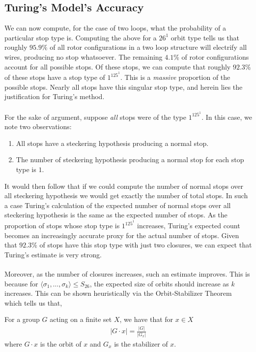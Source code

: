 \subsection{Turing's Model's Accuracy}\label{justify_turing}
We can now compute, for the case of two loops, what the probability of
a particular stop type is. Computing the above for a $26^1$ orbit
type tells us that roughly $95.9\%$ of all rotor configurations
in a two loop structure will electrify all wires, producing no stop
whatsoever. The remaining $4.1\%$ of rotor configurations account for
all possible stops. Of these stops, we can compute that roughly
$92.3\%$ of these stops have a stop type of $1^125^1$. This is a
\emph{massive} proportion of the possible stops. Nearly all stops
have this singular stop type, and herein lies the justification for
Turing's method.
\\\\For the sake of argument, suppose \emph{all} stops were of the
type $1^125^1$. In this case, we note two observations:
\begin{enumerate}[(1)]
  \item All stops have a steckering hypothesis producing a normal stop.
  \item The number of steckering hypothesis producing a normal stop
    for each stop type is $1$.
\end{enumerate}
It would then follow that if we could compute the number of normal
stops over all steckering hypothesis we would get exactly the number
of total stops. In such a case Turing's calculation of the expected
number of normal stops over all steckering hypothesis is the same as
the expected number of stops. As the proportion of stops whose stop
type is $1^125^1$ increases, Turing’s expected count becomes an
increasingly accurate proxy for the actual number of stops. Given
that $92.3\%$ of stops have this stop
type with just two closures, we can expect that Turing's estimate is
very strong.
\\\\Moreover, as the number of closures increases, such an estimate improves.
This is because for $\langle \sigma_1, \dots, \sigma_k\rangle\le
S_{26}$, the expected size of orbits should increase as $k$
increases. This can be shown heuristically via the Orbit-Stabilizer Theorem~\cite[p.~180]{artin2011algebra} which tells us that,
\begin{theorem}
  For a group $G$ acting on a finite set $X$, we have that for $x\in X$
  \begin{align*}
    |G\cdot x| = \frac{|G|}{|G_x|}
  \end{align*}
  where $G\cdot x$ is the orbit of $x$ and $G_x$ is the stabilizer of $x$.
\end{theorem}
